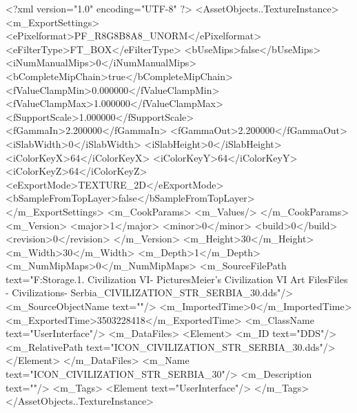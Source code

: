 <?xml version="1.0" encoding="UTF-8" ?>
<AssetObjects..TextureInstance>
	<m_ExportSettings>
		<ePixelformat>PF_R8G8B8A8_UNORM</ePixelformat>
		<eFilterType>FT_BOX</eFilterType>
		<bUseMips>false</bUseMips>
		<iNumManualMips>0</iNumManualMips>
		<bCompleteMipChain>true</bCompleteMipChain>
		<fValueClampMin>0.000000</fValueClampMin>
		<fValueClampMax>1.000000</fValueClampMax>
		<fSupportScale>1.000000</fSupportScale>
		<fGammaIn>2.200000</fGammaIn>
		<fGammaOut>2.200000</fGammaOut>
		<iSlabWidth>0</iSlabWidth>
		<iSlabHeight>0</iSlabHeight>
		<iColorKeyX>64</iColorKeyX>
		<iColorKeyY>64</iColorKeyY>
		<iColorKeyZ>64</iColorKeyZ>
		<eExportMode>TEXTURE_2D</eExportMode>
		<bSampleFromTopLayer>false</bSampleFromTopLayer>
	</m_ExportSettings>
	<m_CookParams>
		<m_Values/>
	</m_CookParams>
	<m_Version>
		<major>1</major>
		<minor>0</minor>
		<build>0</build>
		<revision>0</revision>
	</m_Version>
	<m_Height>30</m_Height>
	<m_Width>30</m_Width>
	<m_Depth>1</m_Depth>
	<m_NumMipMaps>0</m_NumMipMaps>
	<m_SourceFilePath text="F:\Mod Storage\2.1. Civilization VI\Mods\Archive - Pictures\Sid Meier's Civilization VI Art Files\Art Files - Civilizations\Civilization - Serbia\ICON_CIVILIZATION_STR_SERBIA_30.dds"/>
	<m_SourceObjectName text=""/>
	<m_ImportedTime>0</m_ImportedTime>
	<m_ExportedTime>3503228418</m_ExportedTime>
	<m_ClassName text="UserInterface"/>
	<m_DataFiles>
		<Element>
			<m_ID text="DDS"/>
			<m_RelativePath text="ICON_CIVILIZATION_STR_SERBIA_30.dds"/>
		</Element>
	</m_DataFiles>
	<m_Name text="ICON_CIVILIZATION_STR_SERBIA_30"/>
	<m_Description text=""/>
	<m_Tags>
		<Element text="UserInterface"/>
	</m_Tags>
</AssetObjects..TextureInstance>

